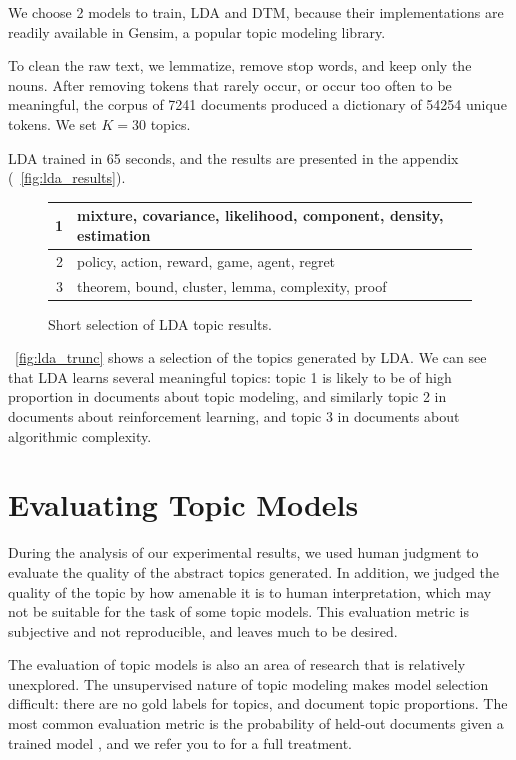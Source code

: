 \documentclass[letterpaper]{article}
\begin{document}
We choose 2 models to train, LDA and DTM, because their
implementations are readily available in Gensim, a popular topic
modeling library.

To clean the raw text, we lemmatize, remove stop words, and keep only
the nouns. After removing tokens that rarely occur, or occur too often
to be meaningful, the corpus of 7241 documents produced a dictionary
of 54254 unique tokens. We set $K = 30$ topics.

LDA trained in 65 seconds, and the results are presented in the
appendix (~\autoref{fig:lda_results}).

\begin{figure}[ht]
  \begin{tabularx}{\linewidth}{|r | X|}
    \hline
    1 & mixture, covariance, likelihood, component, density, estimation \\ \hline
    2 & policy, action, reward, game, agent, regret \\ \hline
    3 & theorem, bound, cluster, lemma, complexity, proof \\ \hline
  \end{tabularx}
  \caption{\label{fig:lda_trunc} Short selection of LDA topic results.}
\end{figure}

~\autoref{fig:lda_trunc} shows a selection of the topics generated by
LDA. We can see that LDA learns several meaningful topics: topic 1 is
likely to be of high proportion in documents about topic modeling, and
similarly topic 2 in documents about reinforcement learning, and topic
3 in documents about algorithmic complexity.

\section{Evaluating Topic Models}
\label{sec:evaluation}
During the analysis of our experimental results, we used human
judgment to evaluate the quality of the abstract topics generated. In
addition, we judged the quality of the topic by how amenable it is to
human interpretation, which may not be suitable for the task of some
topic models. This evaluation metric is subjective and not
reproducible, and leaves much to be desired.

The evaluation of topic models is also an area of research that is
relatively unexplored. The unsupervised nature of topic modeling makes
model selection difficult: there are no gold labels for topics, and
document topic proportions. The most common evaluation metric is the
probability of held-out documents given a trained model
\cite{wallach2009evaluation}, and we refer you to
\citeauthor{wallach2009evaluation} for a full treatment.
\end{document}
